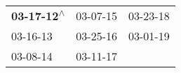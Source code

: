 \begin{supertabular}{lll}
 \textbf{03-17-12\textsuperscript{$\wedge$}} &  03-07-15\textsuperscript{} &  03-23-18\textsuperscript{} \\
                  03-16-13\textsuperscript{} &  03-25-16\textsuperscript{} &  03-01-19\textsuperscript{} \\
                  03-08-14\textsuperscript{} &  03-11-17\textsuperscript{} &                             \\
\end{supertabular}
